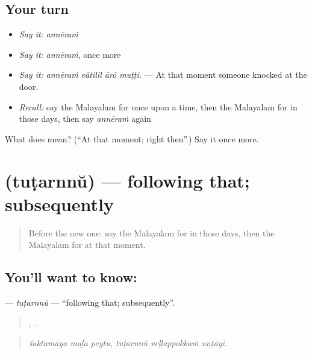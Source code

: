 \subsection*{Your turn}
\begin{itemize}
\raggedright
  \item \emph{Say it:} \emph{annēraṁ}
  \item \emph{Say it:} \emph{annēraṁ}, once more
  \item \emph{Say it:} \emph{annēraṁ vātilil ārō muṭṭi.} — At that moment someone knocked at the door.
  \item \emph{Recall:} say the Malayalam for once upon a time, then the Malayalam for in those days, then say \emph{annēraṁ} again
\end{itemize}

\begin{tcolorbox}[breakable,colback=teal!4,colframe=teal!35!black,title={Before you move on}]
What does  mean? (\textquotedblleft{}At that moment; right then\textquotedblright{}.) Say it once more.
\end{tcolorbox}
\section[\texorpdfstring{\ml{തുടർന്ന്} (tuṭarnnŭ)}{തുടർന്ന് (tuṭarnnŭ)}]{ (tuṭarnnŭ) — following that; subsequently}

\label{lesson:ML-C358-tutarnnu}



\begin{quote}
Before the new one: say the Malayalam for in those days, then the Malayalam for at that moment.
\end{quote}

\subsection*{You'll want to know: }
\textbf{} — \emph{tuṭarnnŭ} — \textquotedblleft{}following that; subsequently\textquotedblright{}.

\begin{quote}
  ,   .
\end{quote}

\begin{quote}
\emph{śaktamāya maḻa peytu, tuṭarnnŭ veḷḷappokkaṁ uṇṭāyi.}
\end{quote}

